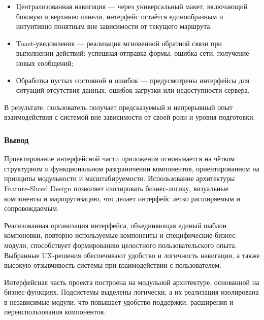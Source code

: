 \begin{itemize}
  \item Централизованная навигация — через универсальный макет, включающий боковую и верхнюю панели, интерфейс остаётся единообразным и интуитивно понятным вне зависимости от текущего маршрута.
  \item Toast-уведомления — реализация мгновенной обратной связи при выполнении действий: успешная отправка формы, ошибка сети, получение новых сообщений;
  \item Обработка пустых состояний и ошибок — предусмотрены интерфейсы для ситуаций отсутствия данных, ошибок загрузки или недоступности сервера.
\end{itemize}

В результате, пользователь получает предсказуемый и непрерывный опыт взаимодействия с системой вне зависимости от своей роли и уровня подготовки.

\subsubsection*{Вывод}

Проектирование интерфейсной части приложения основывается на чётком структурном и функциональном разграничении компонентов, ориентированном на принципы модульности и масштабируемости. Использование архитектуры Feature-Sliced Design позволяет изолировать бизнес-логику, визуальные компоненты и маршрутизацию, что делает интерфейс легко расширяемым и сопровождаемым.

Реализованная организация интерфейса, объединяющая единый шаблон компоновки, повторно используемые компоненты и специфические бизнес-модули, способствует формированию целостного пользовательского опыта. Выбранные UX-решения обеспечивают удобство и логичность навигации, а также высокую отзывчивость системы при взаимодействии с пользователем.


Интерфейсная часть проекта построена на модульной архитектуре, основанной на бизнес-функциях. Подсистемы выделены логически, а их реализация изолирована в независимые модули, что повышает удобство поддержки, расширения и переиспользования компонентов.